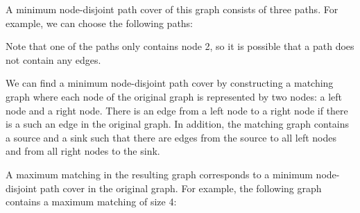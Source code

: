 A minimum node-disjoint path cover
of this graph
consists of three paths.
For example, we can choose the following paths:

\begin{center}
\end{center}

Note that one of the paths only contains node 2,
so it is possible that a path does not contain any edges.

We can find a minimum node-disjoint path cover
by constructing a matching graph where each node
of the original graph is represented by
two nodes: a left node and a right node.
There is an edge from a left node to a right node
if there is a such an edge in the original graph.
In addition, the matching graph contains a source and a sink
such that there are edges from the source to all
left nodes and from all right nodes to the sink.

A maximum matching in the resulting graph corresponds
to a minimum node-disjoint path cover in
the original graph.
For example, the following graph contains
a maximum matching of size 4:

